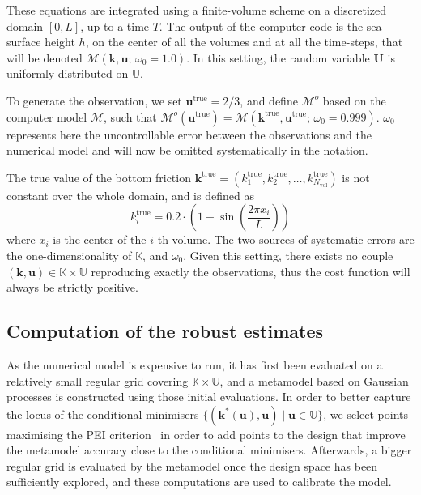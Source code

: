 \documentclass[preprint, review, 1p]{elsarticle}
\newcommand{\Kspace}{\mathbb{K}}
\newcommand{\Uspace}{\mathbb{U}}
\begin{document}
These equations are integrated using a finite-volume scheme on a discretized domain $[0, L]$, up to a time $T$. The output of the computer code is the sea surface height $h$, on the center of all the volumes and at all the time-steps, that will be denoted $\mathcal{M}(\mathbf{k},\mathbf{u};\, \omega_0=1.0)$.
In this setting, the random variable $\mathbf{U}$ is uniformly distributed on $\Uspace$.

To generate the observation, we set $\mathbf{u}^{\mathrm{true}}=2/3$, and define $\mathcal{M}^o$ based on the computer model $\mathcal{M}$, such that $\mathcal{M}^o(\mathbf{u}^{\mathrm{true}}) = \mathcal{M}(\mathbf{k}^{\mathrm{true}}, \mathbf{u}^{\mathrm{true}}; \, \omega_0 = 0.999)$. $\omega_0$  
represents here the uncontrollable error between the observations and the numerical model and will now be omitted systematically in the notation.

The true value of the bottom friction $\mathbf{k}^{\mathrm{true}} = (k_1^{\mathrm{true}}, k_2^{\mathrm{true}},\dots, k_{N_\mathrm{vol}}^{\mathrm{true}})$ is not constant over the whole domain, and is defined as
\begin{equation*}
{k}^{\mathrm{true}}_i = 0.2\cdot \left(1 + \sin\left(\frac{2 \pi x_i}{L}\right)\right)
\end{equation*}
where $x_i$ is the center of the $i$-th volume. The two sources of systematic errors are the one-dimensionality of $\Kspace$, and $\omega_0$.
Given this setting, there exists no couple $(\mathbf{k},\mathbf{u})\in\Kspace \times \Uspace$ reproducing exactly the observations, thus the cost function will always be strictly positive.

\subsection{Computation of the robust estimates}
As the numerical model is expensive to run, it has first been evaluated on a relatively small regular grid covering $\Kspace \times \Uspace$, and a metamodel based on Gaussian processes is constructed using those initial evaluations. In order to better capture the locus of the conditional minimisers $\{(\mathbf{k}^*(\mathbf{u}), \mathbf{u}) \mid \mathbf{u} \in \Uspace \}$, we select points maximising the PEI criterion~\citep{ginsbourger_bayesian_2014,bossek_learning_2015} in order to add points to the design that improve the metamodel accuracy close to the conditional minimisers.
Afterwards, a bigger regular grid is evaluated by the metamodel once the design space has been sufficiently explored, and these computations are used to calibrate the model.
\end{document}
